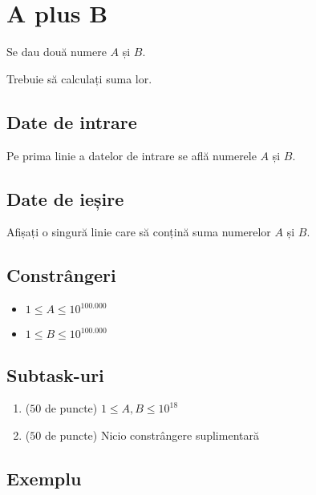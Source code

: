 \documentclass[12pt,a4paper]{article}
\begin{document}


\section*{A plus B}

Se dau două numere $A$ și $B$.

Trebuie să calculați suma lor.


\subsection*{Date de intrare}


Pe prima linie a datelor de intrare se află numerele $A$ și $B$.

\subsection*{Date de ieșire}

Afișați o singură linie care să conțină suma numerelor $A$ și $B$.

\subsection*{Constrângeri}

\begin{itemize}
    \item $1 \leq A \leq 10^{100.000}$
    \item $1 \leq B \leq 10^{100.000}$
\end{itemize}


\subsection*{Subtask-uri}

\begin{enumerate}
    \item ($50$ de puncte) $1 \leq A, B \leq 10^{18}$
    \item ($50$ de puncte) Nicio constrângere suplimentară
\end{enumerate}

\subsection*{Exemplu}
\end{document}
